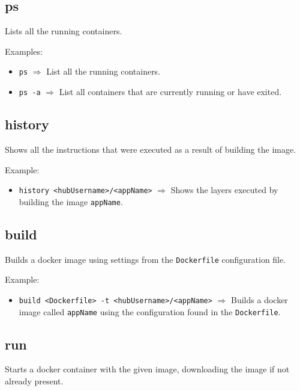 \documentclass[a4paper, 12pt]{article}
\begin{document}
\subsection{ps}

Lists all the running containers.

\vspace{0.5em}
Examples:
\begin{itemize}
	\item \texttt{ps} $\Rightarrow$ List all the running containers.
	\item \texttt{ps -a} $\Rightarrow$ List all containers that are currently
	running or have exited.
\end{itemize}

\subsection{history}

Shows all the instructions that were executed as a result of building the image.

\vspace{0.5em}
Example:
\begin{itemize}
	\item \texttt{history <hubUsername>/<appName>} $\Rightarrow$ Shows the
	layers executed by building the image \texttt{appName}.
\end{itemize}

\subsection{build}

Builds a docker image using settings from the \texttt{Dockerfile} configuration
file.

\vspace{0.5em}
Example:
\begin{itemize}
	\item \texttt{build <Dockerfile> -t <hubUsername>/<appName>} $\Rightarrow$
	Builds a docker image called \texttt{appName} using the configuration found
	in the \texttt{Dockerfile}.
\end{itemize}

\subsection{run}

Starts a docker container with the given image, downloading the image if not
already present.
\end{document}
